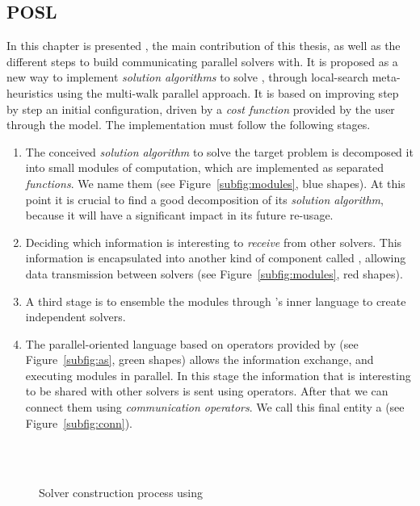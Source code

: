 \subsection{POSL}

In this chapter is presented \posl{}, the main contribution of this thesis, as well as the different steps to build communicating parallel solvers with. It is proposed as a new way to implement \textit{solution algorithms} to solve \CSPs, through local-search meta-heuristics using the multi-walk parallel approach. It is based on improving step by step an initial configuration, driven by a \textit{cost function} provided by the user through the model. The implementation must follow the following stages.

\begin{enumerate}
\item The conceived \textit{solution algorithm} to solve the target problem is decomposed it into small modules of computation, which are implemented as separated {\it functions}. We name them \oms{} (see Figure~\ref{subfig:modules}, blue shapes). At this point it is crucial to find a good decomposition of its \textit{solution algorithm}, because it will have a significant impact in its future re-usage. 
\item Deciding which information is interesting to \textit{receive} from other solvers. This information is encapsulated into another kind of component called \opch, allowing data transmission between solvers (see Figure~\ref{subfig:modules}, red shapes).
\item A third stage is to ensemble the modules through \posl{}'s inner language %
to create independent solvers.
\item The parallel-oriented language based on operators provided by \posl{} (see Figure~\ref{subfig:as}, green shapes) allows the information exchange, and executing modules in parallel. In this stage the information that is interesting to be shared with other solvers is sent using operators. After that we can connect them using {\it communication operators}. We call this final entity a \soset{} (see Figure~\ref{subfig:conn}).
\end{enumerate}

\begin{figure}[h]
	\centering
	\\
	\\
	\caption[]{Solver construction process using \posl}
	\label{fig:posl}
\end{figure}

